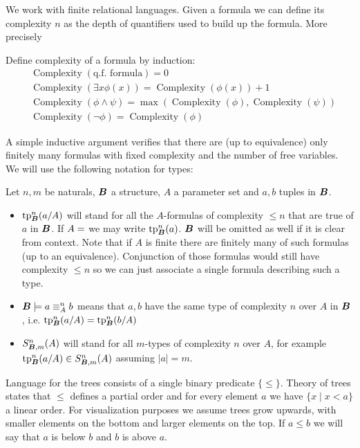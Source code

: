 \documentclass{amsart}
\DeclareMathOperator{\B}{\boldface B}
\DeclareMathOperator{\cx}{Complexity}
\begin{document}
We work with finite relational languages. Given a formula we can define its complexity $n$ as the depth of quantifiers used to build up the formula. More precisely
\begin{Definition}
Define complexity of a formula by induction:
\begin{align*}
	&\cx(\text{q.f. formula}) = 0 \\
	&\cx(\exists x \phi(x)) = \cx(\phi(x)) + 1 \\
	&\cx(\phi \wedge \psi) = \max(\cx(\phi), \cx(\psi)) \\
	&\cx(\neg \phi) = \cx(\phi)
\end{align*}
\end{Definition}
A simple inductive argument verifies that there are (up to equivalence) only finitely many formulas with fixed complexity and the number of free variables. We will use the following notation for types:
\begin{Definition} Let $n,m$ be naturals, $\B$ a structure, $A$ a parameter set and $a,b$ tuples in $\B$.
	\begin{itemize}
		\item $\tp^n_{\B}(a/A)$ will stand for all the $A$-formulas of complexity $\leq n$ that are true of $a$ in $\B$. If $A = \empty$ we may write $\tp^n_{\B}(a)$. $\B$ will be omitted as well if it is clear from context. Note that if $A$ is finite there are finitely many of such formulas (up to an equivalence). Conjunction of those formulas would still have complexity $\leq n$ so we can just associate a single formula describing such a type. 
		\item $\B \models a \equiv^n_A b$ means that $a,b$ have the same type of complexity $n$ over $A$ in $\B$, i.e. $\tp^n_{\B}(a/A) = \tp^n_{\B}(b/A)$
		\item $S^n_{\B, m}(A)$ will stand for all $m$-types of complexity $n$ over $A$, for example $\tp^n_{\B}(a/A) \in S^n_{\B, m}(A)$ assuming $|a| = m$.
	\end{itemize}
\end{Definition}

Language for the trees consists of a single binary predicate $\{\leq\}$. Theory of trees states that $\leq$ defines a partial order and for every element $a$ we have $\{x \mid x < a\}$ a linear order. For visualization purposes we assume trees grow upwards, with smaller elements on the bottom and larger elements on the top. If $a \leq b$ we will say that $a$ is below $b$ and $b$ is above $a$.
\end{document}
